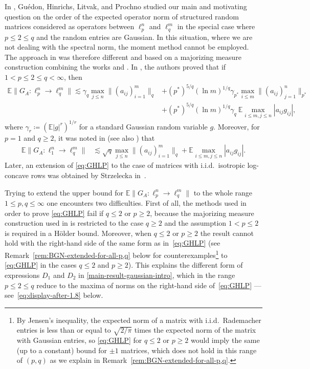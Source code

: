 \documentclass[a4paper]{amsart}
\theoremstyle{definition}
\theoremstyle{remark}
\numberwithin{equation}{section}
\newcommand*{\EE}{\mathbb{E}}
\begin{document}
In \cite{GHLP}, Gu\'edon, Hinrichs, Litvak, and Prochno studied our main and motivating question on the order of the expected operator norm of structured random matrices considered as operators between $\ell_p^n$ and $\ell_q^m$ in the special case where $ p\leq 2\leq q $ and the random entries are Gaussian. In this situation, where we are not dealing with the spectral norm, the moment method cannot be employed. The approach in \cite{GHLP} was therefore different and based on a majorizing measure construction combining the works \cite{GMPT2008} and \cite{GR2007}. In \cite[Theorem 1.1]{GHLP}, the authors proved that if $1< p\leq 2\leq q < \infty$, then
\begin{align}
\nonumber
\EE \|G_A\colon \ell_{p}^n\to\ell_q^m\|
\lesssim
 \gamma_q  \max_{j \leq n}\|(a_{ij})_{i=1}^m\|_q &+ (p^*)^{5/q} (\ln m)^{1/q}
\gamma_{p^*}\max_{i \leq m}\|(a_{ij})_{j=1}^n\|_{p^*} \\
& +  (p^*)^{5/q} (\ln m)^{1/q} \gamma_q \ \EE\max_{i\leq m, j\leq n}|a_{ij}g_{ij}|,
\label{eq:GHLP}
\end{align}
where $\gamma_r \coloneqq (\EE |g|^r)^{1/r}$ for a standard Gaussian random variable $g$. Moreover, for $p = 1$ and $q \ge 2$, it was noted in \cite[Remark~1.4]{GHLP} (see also \cite[Twierdzenie~2]{Matlak}) that
\begin{align}\label{eq:Matlak}
 \EE \|G_A\colon \ell_{1}^n\to\ell_q^m\|
& \lesssim \sqrt{q}  \max_{j\le n} \|(a_{ij})_{i=1}^m\|_q + \EE\max_{i\leq m, j\leq n}|a_{ij}g_{ij}|.
\end{align}
Later, an extension of \eqref{eq:GHLP} to the case of matrices with i.i.d.\ isotropic log-concave rows
was obtained by Strzelecka in~\cite{Strzelecka}.


Trying to extend the upper bound for $\EE\|G_A\colon \ell_p^n \to \ell_q^m\|$ to the whole range $1\leq p, q\leq \infty$ one encounters two difficulties.
First of all, the methods used in order to prove  \eqref{eq:GHLP} fail
if $q\leq 2$ or $p \geq 2$, because the majorizing measure construction used in \cite{GHLP} is restricted to the case $q\geq 2$ and the assumption $1<p\leq 2$ is required in a H\"older bound. Moreover, when $q\leq 2$ or $p \geq 2$ the result cannot hold with the right-hand side of the same form as in~\eqref{eq:GHLP}
(see Remark~\ref{rem:BGN-extended-for-all-p,q} below for counterexamples\footnote{By Jensen's inequality, the expected norm of a matrix with i.i.d.\ Rademacher entries is less than or equal to $\sqrt{2/\pi}$ times the expected norm of the matrix with Gaussian entries, so \eqref{eq:GHLP} for $q\le 2$ or $p\ge 2$ would imply the same (up to a constant) bound for $\pm 1$ matrices, which does not hold in this range of $(p,q)$ as we  explain in Remark~\ref{rem:BGN-extended-for-all-p,q}.}
to \eqref{eq:GHLP} in the cases $q\leq 2$ and $p \geq 2$). 
This explains the different form of expressions $D_1$ and $D_2$
in \eqref{main-result-gaussian-intro}, which in the range $p \le 2 \le q$ reduce to the maxima of norms on the right-hand side of~\eqref{eq:GHLP} --- see~\eqref{eq:display-after-1.8} below.
\end{document}
